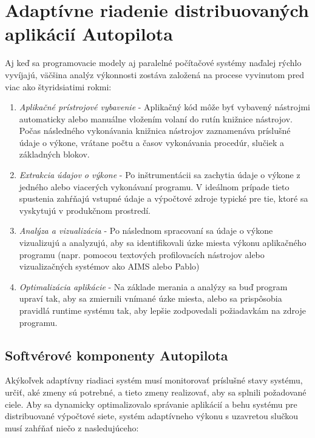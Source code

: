 \documentclass[10pt,twoside,slovak,a4paper]{article}
\begin{document}
\section{Adaptívne riadenie distribuovaných aplikácií Autopilota} \label{ARDAA}

Aj keď sa programovacie modely aj paralelné počítačové systémy naďalej rýchlo vyvíjajú, väčšina analýz výkonnosti zostáva založená na procese vyvinutom pred viac ako štyridsiatimi rokmi:

\begin{enumerate}
\item \emph{Aplikačné prístrojové vybavenie} - Aplikačný kód môže byť vybavený nástrojmi automaticky alebo manuálne vložením volaní do rutín knižnice nástrojov. Počas následného vykonávania knižnica nástrojov zaznamenáva príslušné údaje o výkone, vrátane počtu a časov vykonávania procedúr, slučiek a základných blokov.
\item\emph{Extrakcia údajov o výkone} - Po inštrumentácii sa zachytia údaje o výkone z jedného alebo viacerých vykonávaní programu. V ideálnom prípade tieto spustenia zahŕňajú vstupné údaje a výpočtové zdroje typické pre tie, ktoré sa vyskytujú v produkčnom prostredí.
\item\emph{Analýza a vizualizácia} - Po následnom spracovaní sa údaje o výkone vizualizujú a analyzujú, aby sa identifikovali úzke miesta výkonu aplikačného programu (napr. pomocou textových profilovacích nástrojov alebo vizualizačných systémov ako AIMS  alebo Pablo)
\item\emph{Optimalizácia aplikácie} - Na základe merania a analýzy sa buď program upraví tak, aby sa zmiernili vnímané úzke miesta, alebo sa prispôsobia pravidlá runtime systému tak, aby lepšie zodpovedali požiadavkám na zdroje programu. \cite{SoftverAutopilot}
\end{enumerate}

\subsection{Softvérové komponenty Autopilota}

Akýkoľvek adaptívny riadiaci systém musí monitorovať príslušné stavy systému, určiť, aké zmeny sú potrebné, a tieto zmeny realizovať, aby sa splnili požadované ciele. Aby sa dynamicky optimalizovalo správanie aplikácií a behu systému pre distribuované výpočtové siete, systém adaptívneho výkonu s uzavretou slučkou musí zahŕňať
niečo z nasledujúceho:
\end{document}

